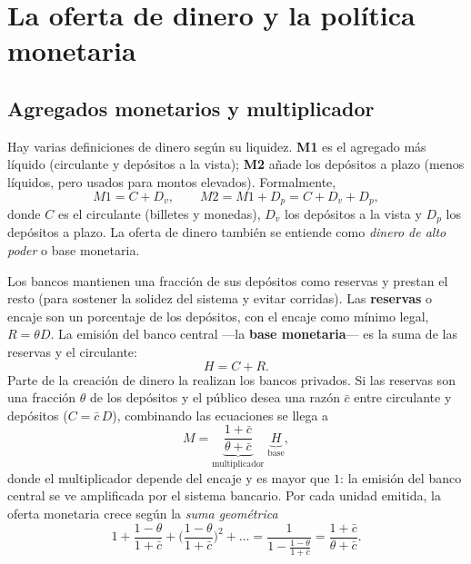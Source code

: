 \documentclass[11pt]{article}
\theoremstyle{definition}
\begin{document}
\section{La oferta de dinero y la política monetaria}

\subsection{Agregados monetarios y multiplicador}

Hay varias definiciones de dinero según su liquidez. \textbf{M1} es el agregado más líquido
(circulante y depósitos a la vista); \textbf{M2} añade los depósitos a plazo (menos líquidos, pero
usados para montos elevados). Formalmente,
\begin{equation}
M1=C+D_{v},\qquad M2=M1+D_{p}=C+D_{v}+D_{p},
\end{equation}
donde $C$ es el circulante (billetes y monedas), $D_{v}$ los depósitos a la vista y $D_{p}$ los
depósitos a plazo. La oferta de dinero también se entiende como \emph{dinero de alto poder} o base
monetaria.

Los bancos mantienen una fracción de sus depósitos como reservas y prestan el resto (para sostener la
solidez del sistema y evitar corridas). Las \textbf{reservas} o encaje son un porcentaje de los
depósitos, con el encaje como mínimo legal, $R=\theta D$. La emisión del banco central ---la
\textbf{base monetaria}--- es la suma de las reservas y el circulante:
\begin{equation}
H=C+R .
\end{equation}
Parte de la creación de dinero la realizan los bancos privados. Si las reservas son una fracción
$\theta$ de los depósitos y el público desea una razón $\bar{c}$ entre circulante y depósitos
($C=\bar{c}\,D$), combinando las ecuaciones se llega a
\begin{equation}
M=\underbrace{\frac{1+\bar{c}}{\theta+\bar{c}}}_{\text{multiplicador}}\;\underbrace{H}_{\text{base}} ,
\end{equation}
donde el multiplicador depende del encaje y es mayor que $1$: la emisión del banco central se ve
amplificada por el sistema bancario. Por cada unidad emitida, la oferta monetaria crece según la
\emph{suma geométrica}
\begin{equation}
1+\frac{1-\theta}{1+\bar{c}}+\Big(\frac{1-\theta}{1+\bar{c}}\Big)^{2}+\dots
=\frac{1}{1-\frac{1-\theta}{1+\bar{c}}}=\frac{1+\bar{c}}{\theta+\bar{c}} .
\end{equation}
\end{document}
